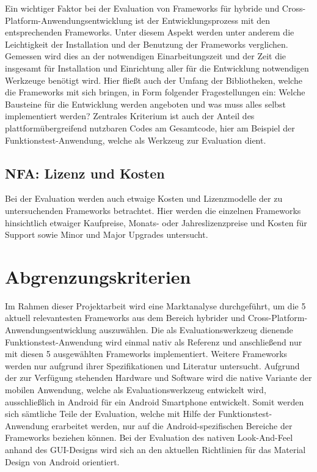 Ein wichtiger Faktor bei der Evaluation von Frameworks für hybride und Cross-Platform-Anwendungsentwicklung ist der Entwicklungsprozess mit den entsprechenden Frameworks. Unter diesem Aspekt werden unter anderem die Leichtigkeit der Installation und der Benutzung der Frameworks verglichen. Gemessen wird dies an der notwendigen Einarbeitungszeit und der Zeit die insgesamt für Installation und Einrichtung aller für die Entwicklung notwendigen Werkzeuge benötigt wird. Hier fließt auch der Umfang der Bibliotheken, welche die Frameworks mit sich bringen, in Form folgender Fragestellungen ein: Welche Bausteine für die Entwicklung werden angeboten und was muss alles selbst implementiert werden? Zentrales Kriterium ist auch der Anteil des plattformübergreifend nutzbaren Codes am Gesamtcode, hier am Beispiel der Funktionstest-Anwendung, welche als Werkzeug zur Evaluation dient. 

\subsection{NFA: Lizenz und Kosten}

Bei der Evaluation werden auch etwaige Kosten und Lizenzmodelle der zu untersuchenden Frameworks betrachtet. Hier werden die einzelnen Frameworks hinsichtlich etwaiger Kaufpreise, Monats- oder Jahreslizenzpreise und Kosten für Support sowie Minor und Major Upgrades untersucht. 

\section{Abgrenzungskriterien}

Im Rahmen dieser Projektarbeit wird eine Marktanalyse durchgeführt, um die 5 aktuell relevantesten Frameworks aus dem Bereich hybrider und Cross-Platform-\\Anwendungsentwicklung auszuwählen. Die als Evaluationswerkzeug dienende \\Funktionstest-Anwendung wird einmal nativ als Referenz und anschließend nur mit diesen 5 ausgewählten Frameworks implementiert. Weitere Frameworks werden nur aufgrund ihrer Spezifikationen und Literatur untersucht. Aufgrund der zur Verfügung stehenden Hardware und Software wird die native Variante der mobilen Anwendung, welche als Evaluationswerkzeug entwickelt wird, ausschließlich in Android für ein Android Smartphone entwickelt. Somit werden sich sämtliche Teile der Evaluation, welche mit Hilfe der Funktionstest-Anwendung erarbeitet werden, nur auf die Android-spezifischen Bereiche der Frameworks beziehen können. Bei der Evaluation des nativen Look-And-Feel anhand des GUI-Designs wird sich an den aktuellen Richtlinien für das Material Design von Android orientiert.